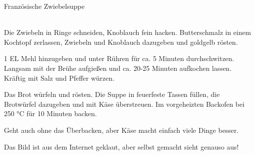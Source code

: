 \begin{recipe}
[ %
    source = Sophie
]
{Französische Zwiebelsuppe}



\preparation
{ %
    \\
Die Zwiebeln in Ringe schneiden, Knoblauch fein hacken. Butterschmalz in einem Kochtopf zerlassen, Zwiebeln und Knoblauch dazugeben und goldgelb rösten.

1 EL Mehl hinzugeben und unter Rühren für ca. 5 Minuten durchschwitzen. Langsam mit der Brühe aufgießen und ca. 20-25 Minuten aufkochen lassen. Kräftig mit Salz und Pfeffer würzen.

Das Brot würfeln und rösten. Die Suppe in feuerfeste Tassen füllen, die Brotwürfel dazugeben und mit Käse überstreuen. Im vorgeheizten Backofen bei 250 °C für 10 Minuten backen.

}

\hint
    {%
    Geht auch ohne das Überbacken, aber Käse macht einfach viele Dinge besser.

    Das Bild ist aus dem Internet geklaut, aber selbst gemacht sieht genauso aus!
    }

\end{recipe}
